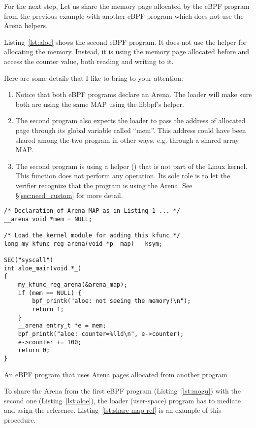 \documentclass{article}
\begin{document}
For the next step, Let us share the memory page allocated by the eBPF program
from the previous example with another eBPF program which does not use the Arena
helpers.

Listing~\ref{lst:aloe} shows the second eBPF program. It does not use the
 helper for allocating the memory. Instead, it is
using the memory page allocated before and access the counter value, both
reading and writing to it.

Here are some details that I like to bring to your attention:
\begin{enumerate}
    \item Notice that both eBPF programs declare an Arena. The loader will
        make sure both are using the same MAP using the libbpf's
         helper.
    \item The second program also expects the loader to pass the address of
        allocated page through its global variable called ``mem''. This address
        could have been shared among the two program in other ways, e.g.
        through a shared array MAP\@.
    \item The second program is using a helper () that is
        not part of the Linux kernel. This function does not perform any
        operation. Its sole role is to let the verifier recognize that the
        program is using the Arena. See \S\ref{sec:need_custom} for more detail.
\end{enumerate}

\begin{listing}
\begin{verbatim}
/* Declaration of Arena MAP as in Listing 1 ... */
__arena void *mem = NULL;

/* Load the kernel module for adding this kfunc */
long my_kfunc_reg_arena(void *p__map) __ksym;

SEC("syscall")
int aloe_main(void *_)
{
    my_kfunc_reg_arena(&arena_map);
    if (mem == NULL) {
        bpf_printk("aloe: not seeing the memory!\n");
        return 1;
    }
    __arena entry_t *e = mem;
    bpf_printk("aloe: counter=%lld\n", e->counter);
    e->counter += 100;
    return 0;
}
\end{verbatim}
\caption{An eBPF program that uses Arena pages allocated from another program}
\label{lst:aloe}
\end{listing}

To share the Arena from the first eBPF program (Listing~\ref{lst:mogu})
with the second one (Listing~\ref{lst:aloe}), the loader (user-space) program
has to mediate and asign the reference. Listing~\ref{lst:share-map-ref} is an
example of this procedure.
\end{document}
